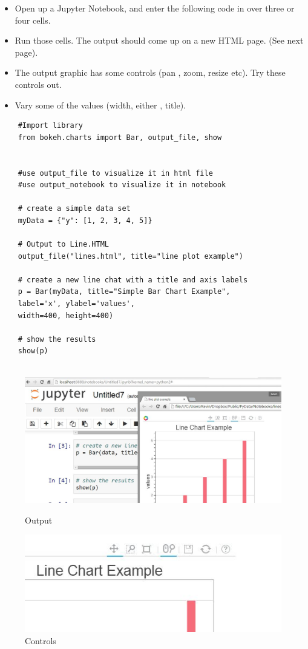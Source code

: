 \documentclass[a4paper,12pt]{article}
\begin{document}
\begin{itemize}
	\item Open up a Jupyter Notebook, and enter the following code in over three or four cells.
	\item Run those cells. The output should come up on a new HTML page. (See next page).
	\item The output graphic has some controls (pan , zoom, resize etc). Try these controls out.
	\item Vary some of the values (width, either , title).
\end{itemize}
\begin{framed}
	\begin{verbatim}
	#Import library
	from bokeh.charts import Bar, output_file, show 
	
	
	#use output_file to visualize it in html file
	#use output_notebook to visualize it in notebook
	
	# create a simple data set
	myData = {"y": [1, 2, 3, 4, 5]}
	
	# Output to Line.HTML
	output_file("lines.html", title="line plot example") 
	
	# create a new line chat with a title and axis labels
	p = Bar(myData, title="Simple Bar Chart Example",
	label='x', ylabel='values', 
	width=400, height=400)
	
	# show the results
	show(p)
	
	\end{verbatim}
\end{framed}
\newpage
\begin{figure}[h!]
	\centering
	\includegraphics[width=0.9\linewidth]{images/OutPut}
	\caption{Output}\vspace{0.5cm}
	\includegraphics[width=0.8\linewidth]{images/TopRightCorner}
	\caption{Controls}
\end{figure}
\newpage
\end{document}
